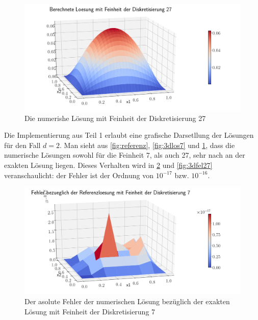 \documentclass[smallheadings]{scrartcl}
\numberwithin{equation}{section}
\begin{document}
\begin{figure}
	\centering
	\includegraphics[width=\linewidth]{Bericht/Bilder2/3dlos27}
	\caption{Die numerishe Lösung mit Feinheit der Diskretisierung 27}
	\label{fig:3dlos27}
\end{figure}

Die Implementierung aus Teil 1 erlaubt eine grafische Darsetllung der Lösungen für den Fall $d=2$. Man sieht aus \ref{fig:referenz}, \ref{fig:3dlos7} und \ref{fig:3dlos27}, dass die numerische Lösungen sowohl für die Feinheit 7, als auch 27, sehr nach an der exakten Lösung liegen. Dieses Verhalten wird in \ref{fig:3dfel7} und \ref{fig:3dfel27} veranschaulicht: der Fehler ist der Ordnung von $10^{-17}$ bzw. $10^{-16}$.

\begin{figure}
	\centering
	\includegraphics[width=\linewidth]{Bericht/Bilder2/3dfeh7}
	\caption{Der asolute Fehler der numerischen Lösung bezüglich der exakten Lösung mit Feinheit der Diskretisierung 7}
	\label{fig:3dfel7}
\end{figure}
\end{document}

